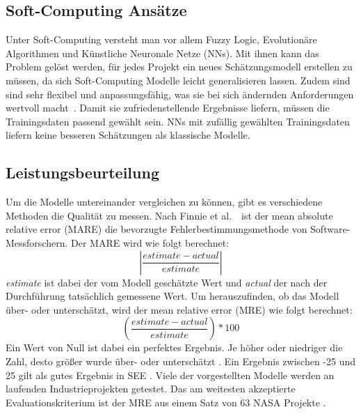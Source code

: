 \subsection{Soft-Computing Ansätze}
Unter Soft-Computing versteht man vor allem Fuzzy Logic, Evolutionäre Algorithmen und Künstliche Neuronale Netze (NNs). Mit ihnen kann das Problem gelöst werden, für jedes Projekt ein neues Schätzungsmodell erstellen zu müssen, da sich Soft-Computing Modelle leicht generalisieren lassen. Zudem sind sind sehr flexibel und anpassungsfähig, was sie bei sich ändernden Anforderungen wertvoll macht~\cite{Boetticher2001}. Damit sie zufriedenstellende Ergebnisse liefern, müssen die Trainingsdaten passend gewählt sein. NNs mit zufällig gewählten Trainingsdaten liefern keine besseren Schätzungen als klassische Modelle. \cite{Setyawati2002}
\\
\subsection{Leistungsbeurteilung}
Um die Modelle untereinander vergleichen zu können, gibt es verschiedene Methoden die Qualität zu messen. Nach Finnie et al.~\cite{Finnie1996}~ist der mean absolute relative error (MARE) die bevorzugte Fehlerbestimmungsmethode von Software-Messforschern. Der MARE wird wie folgt berechnet:
\begin{equation}
\left|\frac{estimate - actual}{estimate}\right|
\end{equation}
\textit{estimate} ist dabei der vom Modell geschätzte Wert und \textit{actual} der nach der Durchführung tatsächlich gemessene Wert. Um herauszufinden, ob das Modell über- oder unterschätzt, wird der mean relative error (MRE) wie folgt berechnet:
\begin{equation}
\left(\frac{estimate - actual}{estimate}\right)*100
\end{equation}
Ein Wert von Null ist dabei ein perfektes Ergebnis. Je höher oder niedriger die Zahl, desto größer wurde über- oder unterschätzt \cite{Finnie1996}. Ein Ergebnis zwischen -25 und 25 gilt als gutes Ergebnis in SEE \cite{Abrahamsson2007}. Viele der vorgestellten Modelle werden an laufenden Industrieprojekten getestet. Das am weitesten akzeptierte Evaluationskriterium ist der MRE aus einem Satz von 63 NASA Projekte \cite{Khalifelu2012}.
\vspace{3.0cm}
